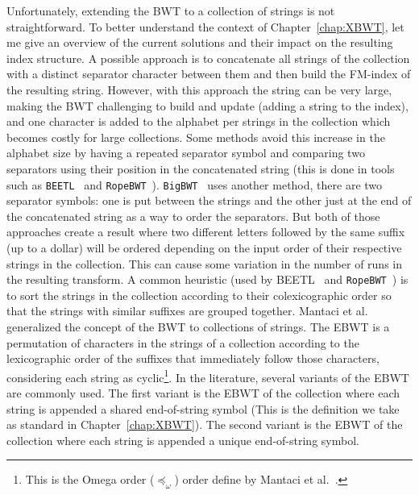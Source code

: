 Unfortunately, extending the BWT to a collection of strings is not straightforward. To better understand the context of Chapter~\ref{chap:XBWT}, let me give an overview of the current solutions and their impact on the resulting index structure. 
A possible approach is to concatenate all strings of the collection with a distinct separator character between them and then build the FM-index of the resulting string. However, with this approach the string can be very large, making the BWT challenging to build and update (adding a string to the index), and one character is added to the alphabet per strings in the collection which becomes costly for large collections. Some methods avoid this increase in the alphabet size by having a repeated separator symbol and comparing two separators using their position in the concatenated string (this is done in tools such as \texttt{BEETL}~\cite{Beetl} and \texttt{RopeBWT}~\cite{ropebwt2}).
\texttt{BigBWT}~\cite{boucher2019prefix} uses another method, there are two separator symbols: one is put between the strings and the other just at the end of the concatenated string as a way to order the separators. But both of those approaches create a result where two different letters followed by the same suffix (up to a dollar) will be ordered depending on the input order of their respective strings in the collection. This can cause some variation in the number of runs in the resulting transform. A common heuristic (used by {BEETL}~\cite{Beetl} and \texttt{RopeBWT}~\cite{ropebwt2}) is to sort the strings in the collection according to their colexicographic order so that the strings with similar suffixes are grouped together.
Mantaci et al.~\cite{MANTACI2007298} generalized the concept of the BWT to collections of strings. The EBWT is a permutation of characters in the strings of a collection according to the lexicographic order of the suffixes that immediately follow those characters, considering each string as cyclic\footnote{This is the Omega order ($\preccurlyeq_\omega$) order define by Mantaci et al.~\cite{MANTACI2007298}.}.
In the literature, several variants of the EBWT are commonly used. The first variant is the EBWT of the collection where each string is appended a shared end-of-string symbol (This is the definition we take as standard in Chapter~\ref{chap:XBWT}). The second variant is the EBWT of the collection where each string is appended a unique end-of-string symbol. 

